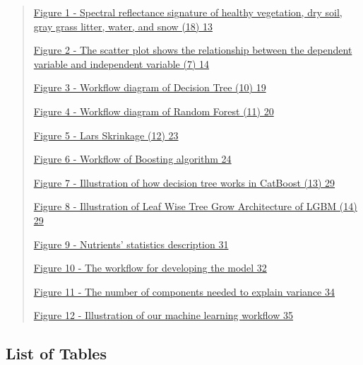 \documentclass[
]{article}
\begin{document}
\begin{quote}
\protect\hyperlink{figure-1---spectral-reflectance-signature-of-healthy-vegetation-dry-soil-gray-grass-litter-water-and-snow-18}{Figure
1 - Spectral reflectance signature of healthy vegetation, dry soil, gray
grass litter, water, and snow (18) 13}

\protect\hyperlink{figure-2---the-scatter-plot-shows-the-relationship-between-the-dependent-variable-and-independent-variable-7}{Figure
2 - The scatter plot shows the relationship between the dependent
variable and independent variable (7) 14}

\protect\hyperlink{figure-3---workflow-diagram-of-decision-tree-10}{Figure
3 - Workflow diagram of Decision Tree (10) 19}

\protect\hyperlink{figure-4---workflow-diagram-of-random-forest-11}{Figure
4 - Workflow diagram of Random Forest (11) 20}

\protect\hyperlink{figure-5---lars-skrinkage-12}{Figure 5 - Lars
Skrinkage (12) 23}

\protect\hyperlink{figure-6---workflow-of-boosting-algorithm}{Figure 6 -
Workflow of Boosting algorithm 24}

\protect\hyperlink{figure-7---illustration-of-how-decision-tree-works-in-catboost-13}{Figure
7 - Illustration of how decision tree works in CatBoost (13) 29}

\protect\hyperlink{figure-8---illustration-of-leaf-wise-tree-grow-architecture-of-lgbm-14}{Figure
8 - Illustration of Leaf Wise Tree Grow Architecture of LGBM (14) 29}

\protect\hyperlink{figure-9---nutrients-statistics-description}{Figure 9
- Nutrients' statistics description 31}

\protect\hyperlink{figure-10---the-workflow-for-developing-the-model}{Figure
10 - The workflow for developing the model 32}

\protect\hyperlink{figure-11---the-number-of-components-needed-to-explain-variance}{Figure
11 - The number of components needed to explain variance 34}

\protect\hyperlink{figure-12---illustration-of-our-machine-learning-workflow}{Figure
12 - Illustration of our machine learning workflow 35}
\end{quote}

\hypertarget{list-of-tables}{%
\subsection{\texorpdfstring{\textbf{List of
Tables}}{List of Tables}}\label{list-of-tables}}
\end{document}
